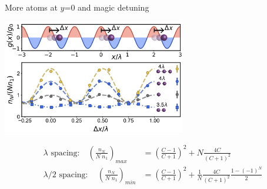 \documentclass{beamer}
\begin{document}
\begin{frame}{More atoms {\tiny at $y$=0 and magic detuning}}
	\vspace{0.5em}
	\begin{minipage}{\textwidth}
		\centering
		\includegraphics[width=0.6\textwidth]{Figure_2b.png}
	\end{minipage}
	{\small\begin{align*}
		\text{$\lambda$ spacing:}\quad \left(\frac{n_N}{N\;n_1}\right)_{max} &= \left(\frac{C-1}{C+1}\right)^2 + N\frac{4C}{(C+1)^2}\\
		\text{$\lambda/2$ spacing:}\,\quad \left(\frac{n_N}{N\;n_1}\right)_{min} &= \left(\frac{C-1}{C+1}\right)^2 + \frac{1}{N}\frac{4C}{(C+1)^2}\frac{1-(-1)^N}{2}
	\end{align*}}
\end{frame}
\end{document}
